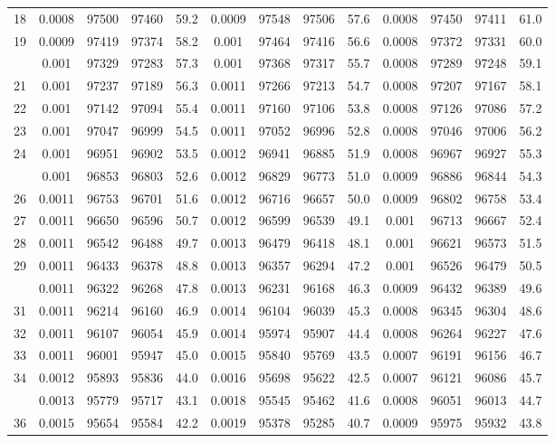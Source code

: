 \documentclass[
  14pt,
]{article}
\begin{document}
\begin{longtable}[t]{lcccccccccccc}
18 & 0.0008 & 97500 & 97460 & 59.2 & 0.0009 & 97548 & 97506 & 57.6 & 0.0008 & 97450 & 97411 & 61.0\\
19 & 0.0009 & 97419 & 97374 & 58.2 & 0.001 & 97464 & 97416 & 56.6 & 0.0008 & 97372 & 97331 & 60.0\\
\addlinespace
20 & 0.001 & 97329 & 97283 & 57.3 & 0.001 & 97368 & 97317 & 55.7 & 0.0008 & 97289 & 97248 & 59.1\\
21 & 0.001 & 97237 & 97189 & 56.3 & 0.0011 & 97266 & 97213 & 54.7 & 0.0008 & 97207 & 97167 & 58.1\\
22 & 0.001 & 97142 & 97094 & 55.4 & 0.0011 & 97160 & 97106 & 53.8 & 0.0008 & 97126 & 97086 & 57.2\\
23 & 0.001 & 97047 & 96999 & 54.5 & 0.0011 & 97052 & 96996 & 52.8 & 0.0008 & 97046 & 97006 & 56.2\\
24 & 0.001 & 96951 & 96902 & 53.5 & 0.0012 & 96941 & 96885 & 51.9 & 0.0008 & 96967 & 96927 & 55.3\\
\addlinespace
25 & 0.001 & 96853 & 96803 & 52.6 & 0.0012 & 96829 & 96773 & 51.0 & 0.0009 & 96886 & 96844 & 54.3\\
26 & 0.0011 & 96753 & 96701 & 51.6 & 0.0012 & 96716 & 96657 & 50.0 & 0.0009 & 96802 & 96758 & 53.4\\
27 & 0.0011 & 96650 & 96596 & 50.7 & 0.0012 & 96599 & 96539 & 49.1 & 0.001 & 96713 & 96667 & 52.4\\
28 & 0.0011 & 96542 & 96488 & 49.7 & 0.0013 & 96479 & 96418 & 48.1 & 0.001 & 96621 & 96573 & 51.5\\
29 & 0.0011 & 96433 & 96378 & 48.8 & 0.0013 & 96357 & 96294 & 47.2 & 0.001 & 96526 & 96479 & 50.5\\
\addlinespace
30 & 0.0011 & 96322 & 96268 & 47.8 & 0.0013 & 96231 & 96168 & 46.3 & 0.0009 & 96432 & 96389 & 49.6\\
31 & 0.0011 & 96214 & 96160 & 46.9 & 0.0014 & 96104 & 96039 & 45.3 & 0.0008 & 96345 & 96304 & 48.6\\
32 & 0.0011 & 96107 & 96054 & 45.9 & 0.0014 & 95974 & 95907 & 44.4 & 0.0008 & 96264 & 96227 & 47.6\\
33 & 0.0011 & 96001 & 95947 & 45.0 & 0.0015 & 95840 & 95769 & 43.5 & 0.0007 & 96191 & 96156 & 46.7\\
34 & 0.0012 & 95893 & 95836 & 44.0 & 0.0016 & 95698 & 95622 & 42.5 & 0.0007 & 96121 & 96086 & 45.7\\
\addlinespace
35 & 0.0013 & 95779 & 95717 & 43.1 & 0.0018 & 95545 & 95462 & 41.6 & 0.0008 & 96051 & 96013 & 44.7\\
36 & 0.0015 & 95654 & 95584 & 42.2 & 0.0019 & 95378 & 95285 & 40.7 & 0.0009 & 95975 & 95932 & 43.8\\

\end{longtable}
\end{document}
